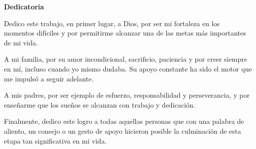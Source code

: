 \clearpage
    \thispagestyle{plain}
    \begin{center}
        \vspace*{2cm}
        \textbf{Dedicatoria}
    \end{center}
    
    \vspace{0.8cm}
    \raggedright
    Dedico este trabajo, en primer lugar, a Dios, por ser mi fortaleza en los momentos difíciles y por permitirme alcanzar una de las metas más importantes de mi vida.

    A mi familia, por su amor incondicional, sacrificio, paciencia y por creer siempre en mí, incluso cuando yo mismo dudaba. Su apoyo constante ha sido el motor que me impulsó a seguir adelante.

    A mis padres, por ser ejemplo de esfuerzo, responsabilidad y perseverancia, y por enseñarme que los sueños se alcanzan con trabajo y dedicación.

    Finalmente, dedico este logro a todas aquellas personas que con una palabra de aliento, un consejo o un gesto de apoyo hicieron posible la culminación de esta etapa tan significativa en mi vida.
    
    \vspace{15cm}
\clearpage
